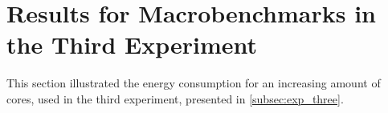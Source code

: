 \section{Results for Macrobenchmarks in the Third Experiment}\label{app:app_exp_three}

This section illustrated the energy consumption for an increasing amount of cores, used in the third experiment, presented in \cref{subsec:exp_three}.



% 

% 
% 
% 

% 
% 
% 

% 
% 
% 

% 
% 
% 